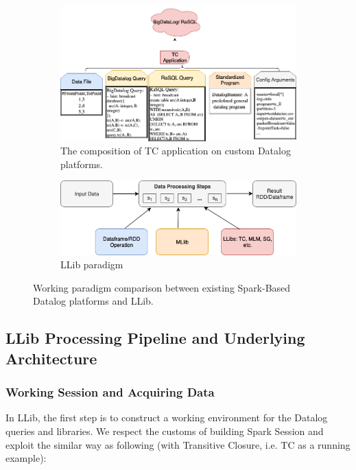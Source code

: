 \begin{figure}[!t]
	\centering
	\begin{subfigure}{0.7\textwidth}
		\centering
		\includegraphics[width=1\linewidth]{Graph/llib/datalogPipeline.png}
		\caption{\small The composition of TC application on custom Datalog platforms. } 
	\end{subfigure}%
	\vspace{\floatsep}
	
	\begin{subfigure}{0.6\textwidth}
		\centering
		\includegraphics[width=1\linewidth]{Graph/llib/DatalogLib-4.png}
		\caption{\small LLib paradigm} 
	\end{subfigure}%
	\caption{Working paradigm comparison between existing Spark-Based Datalog platforms and LLib.}\label{fig:comparison}
	\vspace{-1em}
\end{figure}


\subsection{LLib Processing Pipeline and Underlying Architecture}
\label{sec:pipeline}
\subsubsection{Working Session and Acquiring Data}
\label{sec:data}
In LLib, the first step is to construct a working environment for the Datalog queries and libraries. We respect the customs of building Spark Session and exploit the similar way as following (with Transitive Closure, i.e. TC as a running example):


